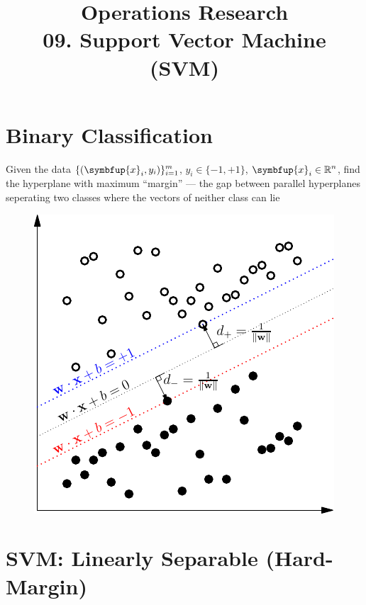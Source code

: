 \documentclass[11pt]{extarticle}
\newcommand{\ds}{\displaystyle}
\newcommand{\vx}{\symbfup{x}}
\theoremstyle{definition}
\begin{document}
\title{\texorpdfstring{\vspace{15mm} Operations Research\\ 09. Support Vector Machine (SVM)}{Operations Research\\ 09. Support Vector Machine (SVM)}} 
\author{}
\date{}
\maketitle

\newpage

\section*{Binary Classification}

Given the data $\ds\{(\vx_i, y_i)\}_{i=1}^m$, $\ds y_i\in\{-1, +1\}$, $\ds\vx_i\in\mathbb{R}^n$, find the hyperplane with maximum ``margin'' --- the gap between parallel hyperplanes seperating two classes where the vectors of neither class can lie

\vspace{-5mm}
\begin{figure}[!htbp]
  \centering
  \includegraphics[scale=0.8]{fig/d1.pdf}
\end{figure}

\newpage

\section*{SVM: Linearly Separable (Hard-Margin)}
\end{document}
